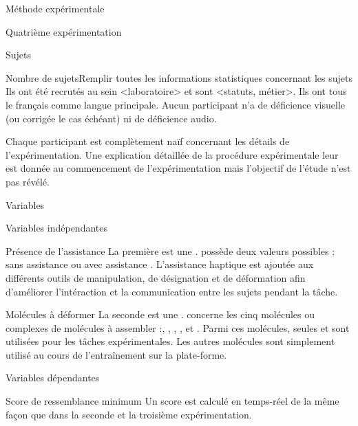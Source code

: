 \documentclass[myfrancais]{mythesis}
\begin{document}
\begin{mychapter}{Méthode expérimentale}
\begin{mysection}{Quatrième expérimentation}
\begin{mysubsection}{Sujets}
\begin{myTodo}{Nombre de sujets}{Remplir toutes les informations statistiques concernant les sujets}
					Ils ont été recrutés au sein \textcolor{myred}{<laboratoire>} et sont \textcolor{myred}{<statuts, métier>}.
					Ils ont tous le français comme langue principale.
					Aucun participant n'a de déficience visuelle (ou corrigée le cas échéant) ni de déficience audio.
				\end{myTodo}

				Chaque participant est complètement naïf concernant les détails de l'expérimentation.
				Une explication détaillée de la procédure expérimentale leur est donnée au commencement de l'expérimentation mais l'objectif de l'étude n'est pas révélé.
			\end{mysubsection}
			\begin{mysubsection}{Variables}
				\begin{mysubsubsection}{Variables indépendantes}
					\begin{myparagraph}{ Présence de l'assistance}
						La première  est une .
						 possède deux valeurs possibles : \og sans assistance \fg ou \og avec assistance \fg.
						L'assistance haptique est ajoutée aux différents outils de manipulation, de désignation et de déformation afin d'améliorer l'intéraction et la communication entre les sujets pendant la tâche.
					\end{myparagraph}
					\begin{myparagraph}{ Molécules à déformer}
						La seconde  est une \myglos{glo-VariableIntraSujets}.
						 concerne les cinq molécules ou complexes de molécules à assembler :, \og \myTRPCAGE \fg, \og \myPrion \fg, \og \myUbiquitin \fg, \og \myTRPZIPPER \fg et \og \myNusENusG \fg.
						Parmi ces molécules, seules \myUbiquitin et \myNusENusG sont utilisées pour les tâches expérimentales.
						Les autres molécules sont simplement utilisé au cours de l'entraînement sur la plate-forme.
					\end{myparagraph}
				\end{mysubsubsection}
				\begin{mysubsubsection}{Variables dépendantes}
					\begin{myparagraph}{ Score de ressemblance minimum}
						Un score  est calculé en temps-réel de la même façon que dans la seconde et la troisième expérimentation.

\end{myparagraph}
\end{mysubsubsection}
\end{mysubsection}
\end{mysection}
\end{mychapter}
\end{document}
